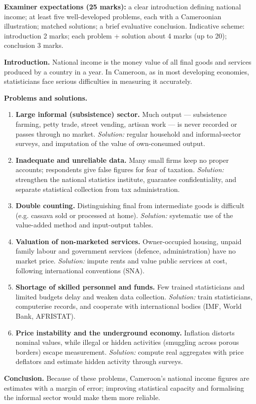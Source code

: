 \documentclass[11pt]{article}
\begin{document}
\begin{corrige}
\textbf{Examiner expectations (25 marks):} a clear introduction defining national income; at least five well-developed problems, each with a Cameroonian illustration; matched solutions; a brief evaluative conclusion. Indicative scheme: introduction 2 marks; each problem + solution about 4 marks (up to 20); conclusion 3 marks.

\textbf{Introduction.} National income is the money value of all final goods and services produced by a country in a year. In Cameroon, as in most developing economies, statisticians face serious difficulties in measuring it accurately.

\textbf{Problems and solutions.}
\begin{enumerate}
\item \textbf{Large informal (subsistence) sector.} Much output — subsistence farming, petty trade, street vending, artisan work — is never recorded or passes through no market. \emph{Solution:} regular household and informal-sector surveys, and imputation of the value of own-consumed output.
\item \textbf{Inadequate and unreliable data.} Many small firms keep no proper accounts; respondents give false figures for fear of taxation. \emph{Solution:} strengthen the national statistics institute, guarantee confidentiality, and separate statistical collection from tax administration.
\item \textbf{Double counting.} Distinguishing final from intermediate goods is difficult (e.g. cassava sold or processed at home). \emph{Solution:} systematic use of the value-added method and input-output tables.
\item \textbf{Valuation of non-marketed services.} Owner-occupied housing, unpaid family labour and government services (defence, administration) have no market price. \emph{Solution:} impute rents and value public services at cost, following international conventions (SNA).
\item \textbf{Shortage of skilled personnel and funds.} Few trained statisticians and limited budgets delay and weaken data collection. \emph{Solution:} train statisticians, computerise records, and cooperate with international bodies (IMF, World Bank, AFRISTAT).
\item \textbf{Price instability and the underground economy.} Inflation distorts nominal values, while illegal or hidden activities (smuggling across porous borders) escape measurement. \emph{Solution:} compute real aggregates with price deflators and estimate hidden activity through surveys.
\end{enumerate}

\textbf{Conclusion.} Because of these problems, Cameroon's national income figures are estimates with a margin of error; improving statistical capacity and formalising the informal sector would make them more reliable.
\end{corrige}
\end{document}
